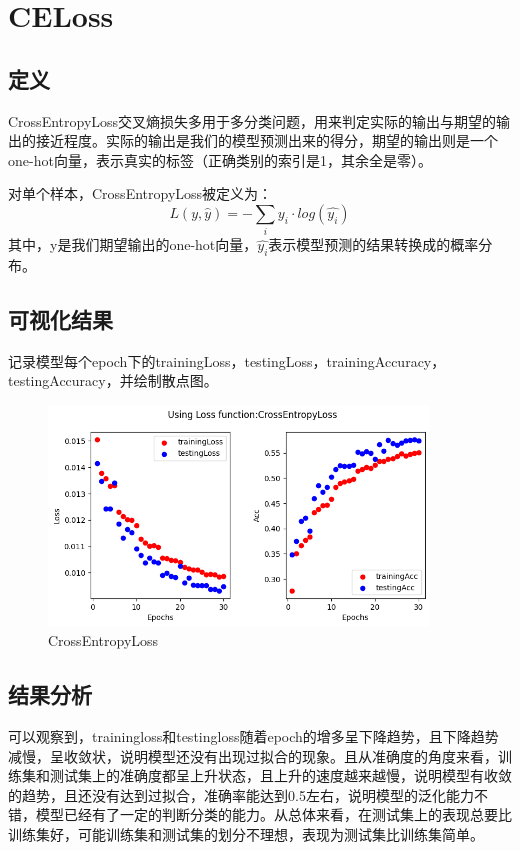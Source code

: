 \documentclass{article}
\begin{document}
\section{CELoss}

\subsection{定义}
CrossEntropyLoss交叉熵损失多用于多分类问题，用来判定实际的输出与期望的输出的接近程度。实际的输出是我们的模型预测出来的得分，期望的输出则是一个one-hot向量，表示真实的标签（正确类别的索引是1，其余全是零）。

对单个样本，CrossEntropyLoss被定义为：
$$
L(y,\hat{y})=-\sum_{i}y_i · log(\hat{y_i})
$$
其中，y是我们期望输出的one-hot向量，$\hat{y_i}$表示模型预测的结果转换成的概率分布。

\subsection{可视化结果}

记录模型每个epoch下的trainingLoss，testingLoss，trainingAccuracy，testingAccuracy，并绘制散点图。
\begin{figure}[H]
    \centering
    \includegraphics[width=0.9\textwidth]{Figure/CrossEntropyLoss.png}
    \caption{CrossEntropyLoss}
    \label{fig:CrossEntropyLoss}
\end{figure}

\subsection{结果分析}
可以观察到，trainingloss和testingloss随着epoch的增多呈下降趋势，且下降趋势减慢，呈收敛状，说明模型还没有出现过拟合的现象。且从准确度的角度来看，训练集和测试集上的准确度都呈上升状态，且上升的速度越来越慢，说明模型有收敛的趋势，且还没有达到过拟合，准确率能达到0.5左右，说明模型的泛化能力不错，模型已经有了一定的判断分类的能力。从总体来看，在测试集上的表现总要比训练集好，可能训练集和测试集的划分不理想，表现为测试集比训练集简单。
\end{document}
